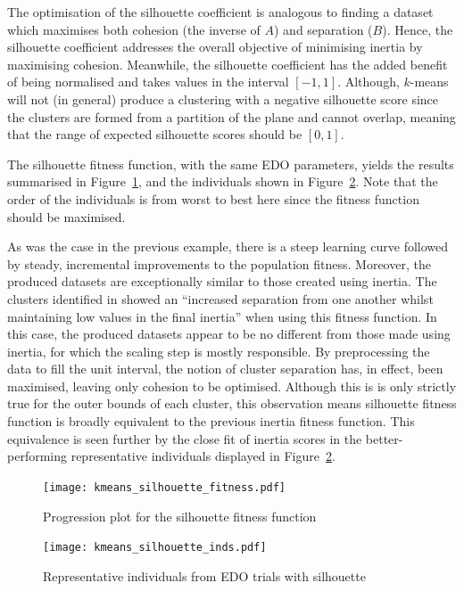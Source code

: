 The optimisation of the silhouette coefficient is analogous to finding a dataset
which maximises both cohesion (the inverse of \(A\)) and separation (\(B\)).
Hence, the silhouette coefficient addresses the overall objective of minimising
inertia by maximising cohesion. Meanwhile, the silhouette coefficient has the
added benefit of being normalised and takes values in the interval \(\left[-1,
1\right]\). Although, \(k\)-means will not (in general) produce a clustering
with a negative silhouette score since the clusters are formed from a partition
of the plane and cannot overlap, meaning that the range of expected silhouette
scores should be \(\left[0, 1\right]\).

The silhouette fitness function, with the same EDO parameters, yields the
results summarised in Figure~\ref{fig:kmeans_silhouette_fitness}, and the
individuals shown in Figure~\ref{fig:kmeans_silhouette_inds}. Note that the
order of the individuals is from worst to best here since the fitness function
should be maximised.

As was the case in the previous example, there is a steep learning curve
followed by steady, incremental improvements to the population fitness.
Moreover, the produced datasets are exceptionally similar to those created using
inertia. The clusters identified in \cite{Wilde2020:edo} showed an ``increased
separation from one another whilst maintaining low values in the final inertia''
when using this fitness function. In this case, the produced datasets appear to
be no different from those made using inertia, for which the scaling step is
mostly responsible. By preprocessing the data to fill the unit interval, the
notion of cluster separation has, in effect, been maximised, leaving only
cohesion to be optimised. Although this is is only strictly true for the outer
bounds of each cluster, this observation means silhouette fitness function is
broadly equivalent to the previous inertia fitness function. This equivalence is
seen further by the close fit of inertia scores in the better-performing
representative individuals displayed in Figure~\ref{fig:kmeans_silhouette_inds}.

\begin{figure}
    \centering
    \texttt{[image: kmeans\_silhouette\_fitness.pdf]}
    \caption{%
        Progression plot for the silhouette fitness function
    }\label{fig:kmeans_silhouette_fitness}
\end{figure}

\begin{figure}
    \centering
    \texttt{[image: kmeans\_silhouette\_inds.pdf]}
    \caption{%
        Representative individuals from EDO trials with silhouette
    }\label{fig:kmeans_silhouette_inds}
\end{figure}


